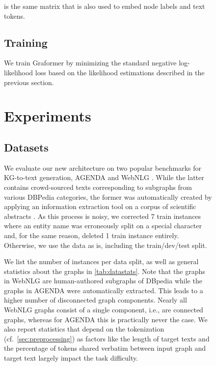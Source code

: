 \documentclass[11pt]{article}
\begin{document}
\begin{figure}
\begin{tabular}
is the same matrix
that is also used to embed node labels and text tokens.

\subsection{Training}
We train Graformer by minimizing the standard negative log-likelihood loss
based on the likelihood estimations described in the previous section. 

\section{Experiments}

\subsection{Datasets}
We evaluate our new architecture on two popular benchmarks
for KG-to-text generation,
AGENDA \citep{koncel-kedziorski-etal-2019-text}
and WebNLG \citep{gardent-etal-2017-webnlg}.
While the latter contains crowd-sourced texts corresponding to subgraphs from various DBPedia categories,
the former was automatically created by applying an information extraction tool \citep{luan-etal-2018-multi}
on a corpus of scientific abstracts \citep{ammar-etal-2018-construction}.
As this process is noisy,
we corrected 7 train instances where an entity name was erroneously split on a special character
and, for the same reason, deleted 1 train instance entirely.
Otherwise, we use the data as is, including the
train/dev/test split.

We list the number of instances per data split,
as well as general statistics about the graphs in \cref{tab:datastats}.
Note that the graphs in WebNLG are human-authored subgraphs of DBpedia
while the graphs in AGENDA were automatically extracted.
This leads to a higher number of disconnected graph components.
Nearly all WebNLG graphs consist of a single component,
i.e., are connected graphs,
whereas for AGENDA this is practically never the case.
We also report statistics that depend on the tokenization (cf.\ \cref{sec:preprocessing})
as factors like the length of target texts
and the percentage of tokens shared verbatim between input graph and target text
largely impact the task difficulty.


\end{tabular}
\end{figure}
\end{document}
